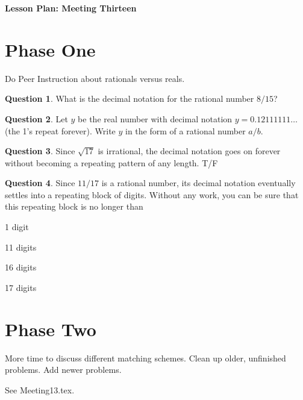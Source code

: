 \documentclass[12pt]{amsart}
\theoremstyle{definition}
\newtheorem{question}{Question}
\begin{document}
\begin{center}
\textbf{\Huge
Lesson Plan: Meeting Thirteen
}
\end{center}
\vspace{.5in}

\section*{Phase One}

Do Peer Instruction about rationals versus reals.

\begin{question}
What is the decimal notation for the rational number $8/15$?
\end{question}

\begin{question}
Let $y$ be the real number with decimal notation $y = 0.12111111\ldots$ (the 1's repeat forever). Write $y$ in the form of a rational number $a/b$.
\end{question}

\begin{question}
Since $\sqrt{17}$ is irrational, the decimal notation goes on forever without becoming a repeating pattern of any length. T/F
\end{question}

\begin{question}
Since $11/17$ is a rational number, its decimal notation eventually settles into a repeating block of digits. Without any work, you can be sure that this repeating block is no longer than
\begin{compactitem}
\item 1 digit
\item 11 digits
\item 16 digits
\item 17 digits
\end{compactitem}
\end{question}

\section*{Phase Two}

More time to discuss different matching schemes.
Clean up older, unfinished problems.
Add newer problems.

See Meeting13.tex.
\end{document}
